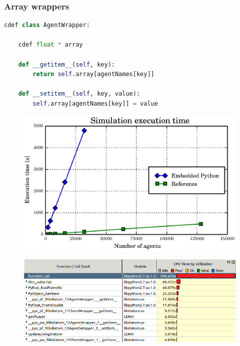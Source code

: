 \documentclass[t]{beamer}
\begin{document}
\begin{frame}[fragile,c]

\frametitle{\huge Array wrappers}
\begin{lstlisting}[language=python]
cdef class AgentWrapper:

    cdef float * array

    def __getitem__(self, key):
        return self.array[agentNames[key]]

    def __setitem__(self, key, value):
        self.array[agentNames[key]] = value
\end{lstlisting}
\end{frame}


\begin{frame}[c]

\begin{figure}[ht!]
  \begin{center}
    \includegraphics[width=\columnwidth]{graphs/cython-perf.eps}
  \end{center}
\end{figure}

\end{frame}


\begin{frame}[c]

\begin{figure}[ht!]
  \begin{center}
    \includegraphics[width=\textwidth,natwidth=696,natheight=271]{images/vtune-cython-pure.png}
  \end{center}
\end{figure}

\end{frame}
\end{document}
